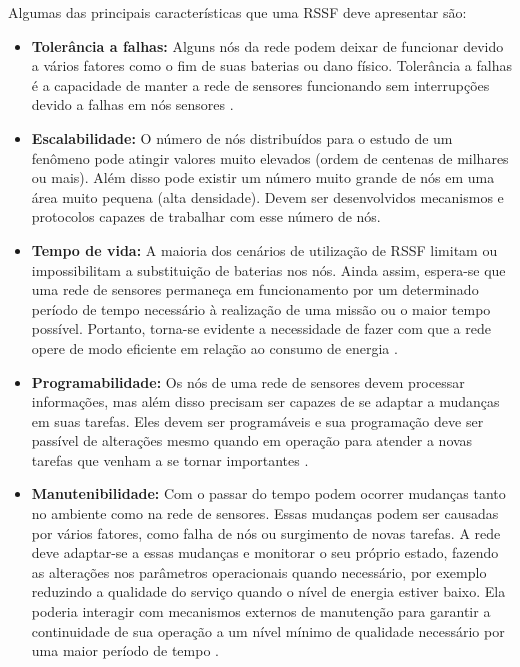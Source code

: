 Algumas das principais características que uma RSSF deve apresentar são:
 \begin{itemize}
 \item \textbf{Tolerância a falhas:} Alguns nós da rede podem deixar de funcionar devido a vários fatores como o fim de suas baterias ou dano físico. Tolerância a falhas é a capacidade de manter a rede de sensores funcionando sem interrupções devido a falhas em nós sensores \cite{Srisathapornphat2001,Hoblos2000}.
 \item \textbf{Escalabilidade:} O número de nós distribuídos para o estudo de um fenômeno pode atingir valores muito elevados (ordem de centenas de milhares ou mais). Além disso pode existir um número muito grande de nós em uma área muito pequena (alta densidade). Devem ser desenvolvidos mecanismos e protocolos capazes de trabalhar com esse número de nós.
 \item \textbf{Tempo de vida:} A maioria dos cenários de utilização de RSSF limitam ou impossibilitam a substituição de baterias nos nós. Ainda assim, espera-se que uma rede de sensores permaneça em funcionamento por um determinado período de tempo necessário à realização de uma missão ou o maior tempo possível. Portanto, torna-se evidente a necessidade de fazer com que a rede opere de modo eficiente em relação ao consumo de energia \cite{Karl2005}.
 \item \textbf{Programabilidade:} Os nós de uma rede de sensores devem processar informações, mas além disso precisam ser capazes de se adaptar a mudanças em suas tarefas. Eles devem ser programáveis e sua programação deve ser passível de alterações mesmo quando em operação para atender a novas tarefas que venham a se tornar importantes \cite{Karl2005}.
 \item \textbf{Manutenibilidade:} Com o passar do tempo podem ocorrer mudanças tanto no ambiente como na rede de sensores. Essas mudanças podem ser causadas por vários fatores, como falha de nós ou surgimento de novas tarefas. A rede deve adaptar-se a essas mudanças e monitorar o seu próprio estado, fazendo as alterações nos parâmetros operacionais quando necessário, por exemplo reduzindo a qualidade do serviço quando o nível de energia estiver baixo. Ela poderia interagir com mecanismos externos de manutenção para garantir a continuidade de sua operação a um nível mínimo de qualidade necessário por uma maior período de tempo \cite{Mainwaring2002}.
 \end{itemize}


